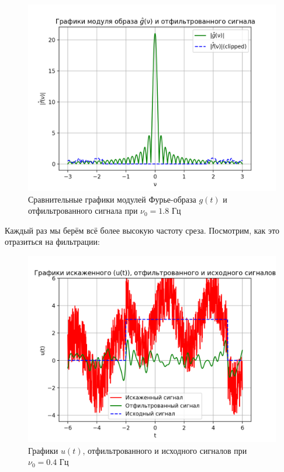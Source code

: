 \begin{figure}[ht!]
    \centering
    \includegraphics[scale=0.55]{media/1 task/low_freq/Fourier_Image_Comparison_4_2_2-1,7987987987987988.png}
    \caption{Сравнительные графики модулей Фурье-образа $g(t)$ и отфильтрованного сигнала при $\nu_0=1.8$ Гц}
    \label{fig:fourc_4_2_2_1.8}
\end{figure}


Каждый раз мы берём всё более высокую частоту среза. Посмотрим, как это отразиться на фильтрации:

\begin{figure}[ht!]
    \centering
    \includegraphics[scale=0.75]{media/1 task/low_freq/Cleaned_4_2_2_-0,4.png}
    \caption{Графики  $u(t)$, отфильтрованного и исходного сигналов при $\nu_0=0.4$ Гц}
    \label{fig:cleaned_4_2_2_0.4}
\end{figure}

